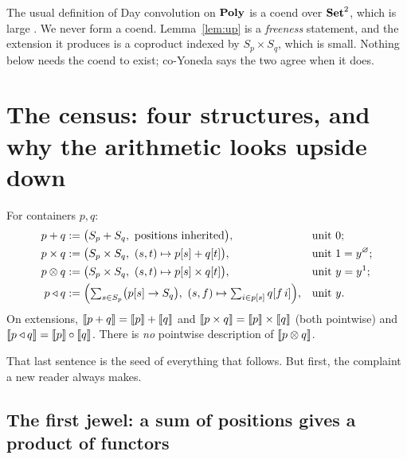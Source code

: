 \begin{Remark}\label{rem:size}
The usual definition of Day convolution on $\mathbf{Poly}$ is a coend over $\mathbf{Set}^2$,
which is large \cite[eq.~(3.80)]{NiuSpivak}. We never form a coend.
Lemma~\ref{lem:up} is a \emph{freeness} statement, and the extension it produces
is a coproduct indexed by $S_p\times S_q$, which is small. Nothing below needs
the coend to exist; co-Yoneda \cite[eq.~(3.81)]{NiuSpivak} says the two agree
when it does.
\end{Remark}

\section{The census: four structures, and why the arithmetic looks upside down}
\label{sec:census}

\begin{Definition}\label{def:four}
For containers $p,q$:
\begin{align*}
 p + q &:= \bigl(S_p + S_q,\ \text{positions inherited}\bigr),
   &&\text{unit } 0;\\
 p\times q &:= \bigl(S_p\times S_q,\ (s,t)\mapsto p[s] + q[t]\bigr),
   &&\text{unit } 1 = y^{\varnothing};\\
 p\mathbin{\otimes} q &:= \bigl(S_p\times S_q,\ (s,t)\mapsto p[s]\times q[t]\bigr),
   &&\text{unit } y = y^{1};\\
 p\mathbin{\triangleleft} q &:= \Bigl(\textstyle\sum_{s\in S_p}\bigl(p[s]\to S_q\bigr),\
   (s,f)\mapsto \textstyle\sum_{i\in p[s]} q[f\,i]\Bigr),
   &&\text{unit } y .
\end{align*}
On extensions, $\llbracket p+q \rrbracket=\llbracket p \rrbracket+\llbracket q \rrbracket$ and $\llbracket p\times q \rrbracket=\llbracket p \rrbracket\times\llbracket q \rrbracket$
(both pointwise) and $\llbracket p\mathbin{\triangleleft} q \rrbracket=\llbracket p \rrbracket\circ\llbracket q \rrbracket$. There is \emph{no}
pointwise description of $\llbracket p\mathbin{\otimes} q \rrbracket$.
\end{Definition}

That last sentence is the seed of everything that follows. But first, the
complaint a new reader always makes.

\subsection{The first jewel: a sum of positions gives a product of functors}

